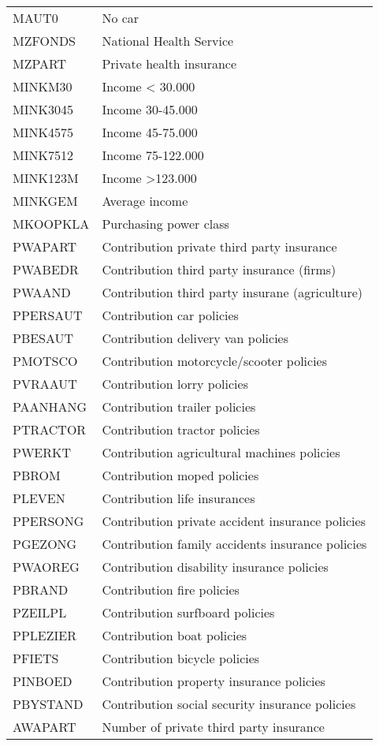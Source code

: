 \documentclass[man]{apa6}
\begin{document}
\begin{center}
\begin{ThreePartTable}
\begin{longtable}{ll}
MAUT0 & No car\\
MZFONDS & National Health Service\\
MZPART & Private health insurance\\
MINKM30 & Income < 30.000\\
MINK3045 & Income 30-45.000\\
MINK4575 & Income 45-75.000\\
MINK7512 & Income 75-122.000\\
MINK123M & Income >123.000\\
MINKGEM & Average income\\
MKOOPKLA & Purchasing power class\\
PWAPART & Contribution private third party insurance\\
PWABEDR & Contribution third party insurance (firms)\\
PWAAND & Contribution third party insurane (agriculture)\\
PPERSAUT & Contribution car policies\\
PBESAUT & Contribution delivery van policies\\
PMOTSCO & Contribution motorcycle/scooter policies\\
PVRAAUT & Contribution lorry policies\\
PAANHANG & Contribution trailer policies\\
PTRACTOR & Contribution tractor policies\\
PWERKT & Contribution agricultural machines policies\\
PBROM & Contribution moped policies\\
PLEVEN & Contribution life insurances\\
PPERSONG & Contribution private accident insurance policies\\
PGEZONG & Contribution family accidents insurance policies\\
PWAOREG & Contribution disability insurance policies\\
PBRAND & Contribution fire policies\\
PZEILPL & Contribution surfboard policies\\
PPLEZIER & Contribution boat policies\\
PFIETS & Contribution bicycle policies\\
PINBOED & Contribution property insurance policies\\
PBYSTAND & Contribution social security insurance policies\\
AWAPART & Number of private third party insurance\\

\end{longtable}
\end{ThreePartTable}
\end{center}
\end{document}
